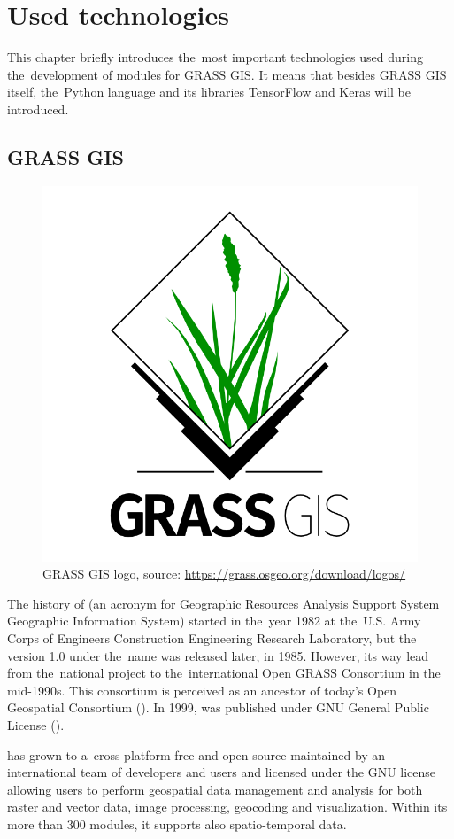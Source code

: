 \chapter{Used technologies}
\label{technologies}

This chapter briefly introduces the~most important technologies used during
the~development of modules for GRASS GIS. It means that besides GRASS GIS itself, 
the~Python language and its libraries TensorFlow and Keras will be introduced.

\section{GRASS GIS}
\label{grass}

\begin{figure}[H]
   \centering
	\includegraphics[width=0.4\linewidth]{./pictures/grass-logo.png}
	\caption[GRASS GIS logo]{GRASS GIS logo, source: \url{https://grass.osgeo.org/download/logos/}}
      \label{fig:grass-logo}
\end{figure}

The history of   (an acronym for Geographic Resources Analysis 
Support System Geographic Information System) started in the~year 1982 at the~U.S. 
Army Corps of Engineers Construction Engineering Research Laboratory, but the~
version 1.0 under the~name  was released later, in 1985. However, its 
way lead from the~national project to the~international Open GRASS Consortium in 
the mid-1990s. This consortium is perceived as an ancestor of today's Open 
Geospatial Consortium (). In 1999,   was published 
under GNU General Public License ().

  has grown to a~cross-platform free and open-source  
maintained by an international team of developers and users and licensed under 
the GNU  license allowing users to perform geospatial data management 
and analysis for both raster and vector data, image processing, geocoding and 
visualization. Within its more than 300 modules, it supports also 
spatio-temporal data.

